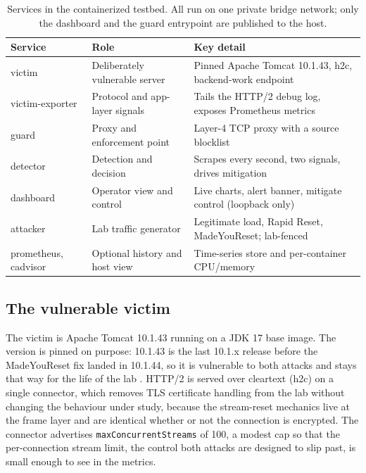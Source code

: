 \documentclass[a4paper,fleqn]{cas-dc}
\begin{document}
\begin{table}[tp]
\centering
\caption{Services in the containerized testbed. All run on one private bridge network; only the dashboard and the guard entrypoint are published to the host.}
\label{tab:services}
\begin{tabular}{@{}lll@{}}
\toprule
Service & Role & Key detail \\
\midrule
victim & Deliberately vulnerable server & Pinned Apache Tomcat 10.1.43, h2c, backend-work endpoint \\
victim-exporter & Protocol and app-layer signals & Tails the HTTP/2 debug log, exposes Prometheus metrics \\
guard & Proxy and enforcement point & Layer-4 TCP proxy with a source blocklist \\
detector & Detection and decision & Scrapes every second, two signals, drives mitigation \\
dashboard & Operator view and control & Live charts, alert banner, mitigate control (loopback only) \\
attacker & Lab traffic generator & Legitimate load, Rapid Reset, MadeYouReset; lab-fenced \\
\midrule
prometheus, cadvisor & Optional history and host view & Time-series store and per-container CPU/memory \\
\bottomrule
\end{tabular}
\end{table}

\subsection{The vulnerable victim}\label{sec:victim}

The victim is Apache Tomcat 10.1.43 running on a JDK 17 base image. The version is pinned on purpose: 10.1.43 is the last 10.1.x release before the MadeYouReset fix landed in 10.1.44, so it is vulnerable to both attacks and stays that way for the life of the lab \cite{cve202548989}. HTTP/2 is served over cleartext (h2c) on a single connector, which removes TLS certificate handling from the lab without changing the behaviour under study, because the stream-reset mechanics live at the frame layer and are identical whether or not the connection is encrypted. The connector advertises \texttt{maxConcurrentStreams} of 100, a modest cap so that the per-connection stream limit, the control both attacks are designed to slip past, is small enough to see in the metrics.
\end{document}
